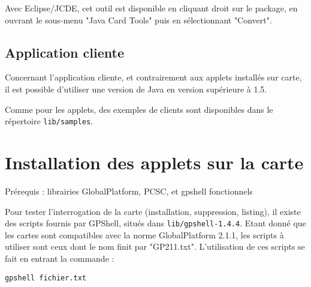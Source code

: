 \documentclass[a4paper,11pt,french]{article}
\begin{document}
Avec Eclipse/JCDE, cet outil est disponible en cliquant droit sur le package,
en ouvrant le sous-menu "Java Card Tools" puis en sélectionnant "Convert".


\subsection{Application cliente}
Concernant l'application cliente, et contrairement aux applets installés sur 
carte, il est possible d'utiliser une version de Java en version supérieure à 1.5.

Comme pour les applets, des exemples de clients sont disponibles dans le répertoire
\texttt{lib/samples}.


\section{Installation des applets sur la carte}
Prérequis : librairies GlobalPlatform, PCSC, et gpshell fonctionnels

Pour tester l'interrogation de la carte (installation, suppression,
listing), il existe des scripts fournis par GPShell, situés dans \texttt{lib/gpshell-1.4.4}.
Etant donné que les cartes sont compatibles avec la norme GlobalPlatform 2.1.1,
les scripts à utiliser sont ceux dont le nom finit par "GP211.txt".
L'utilisation de ces scripts se fait en entrant la commande : 
\begin{verbatim}
gpshell fichier.txt
\end{verbatim}
\end{document}
